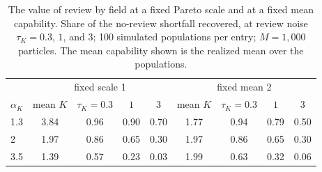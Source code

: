 \begin{table}[t]
\centering
\small
\caption{The value of review by field at a fixed Pareto scale and at a fixed mean capability. Share of the no-review shortfall recovered, at review noise $\tau_K = 0.3$, $1$, and $3$; 100 simulated populations per entry; $M = 1{,}000$ particles. The mean capability shown is the realized mean over the populations.}
\label{tab:sens-mean}
\begin{tabular}{@{}lcccccccc@{}}
\toprule
& \multicolumn{4}{c}{fixed scale 1} & \multicolumn{4}{c}{fixed mean 2} \\
$\alpha_K$ & mean $K$ & $\tau_K = 0.3$ & $1$ & $3$ & mean $K$ & $\tau_K = 0.3$ & $1$ & $3$ \\
\midrule
1.3 & 3.84 & 0.96 & 0.90 & 0.70 & 1.77 & 0.94 & 0.79 & 0.50 \\
2 & 1.97 & 0.86 & 0.65 & 0.30 & 1.97 & 0.86 & 0.65 & 0.30 \\
3.5 & 1.39 & 0.57 & 0.23 & 0.03 & 1.99 & 0.63 & 0.32 & 0.06 \\
\bottomrule
\end{tabular}
\end{table}
